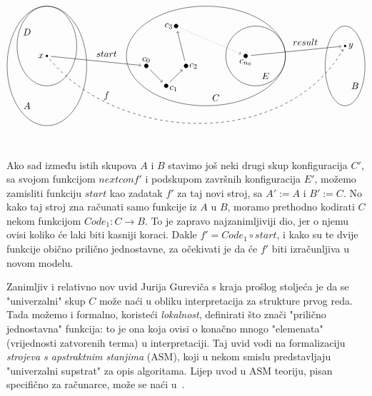 \begin{equation}\label{dia:alg}
\begin{tikzpicture}[scale=0.75,baseline=(c0)]
\draw (0,0) ellipse (2 and 3);
\draw (8,0.5) ellipse (4 and 2.5);
\draw (15,0) ellipse (1 and 2);
\draw (0,1) ellipse (1.5 and 2);
\draw (10.5,0.5) circle (1.5);
\draw[fill] (0,0.5) coordinate (x) circle (0.05) node[left]{$x$};
\node at(-1,1.7) {$D$};
\node at(-1,-2) {$A$};
\node at(8.5,-1.6) {$C$};
\node at(11,-0.5) {$E$};
\node at(15.5,-1) {$B$};
\node at(3,0.6) {$start$};
\node at(13,1.2) {$result$};
\node at(3,-1.5) {$f$};
\draw[fill] (5,0) coordinate (c0) circle (0.1) node[above]{$c_0$};
\draw[fill] (6,-1) coordinate (c1) circle (0.1) node[right,yshift=-3]{$c_1$};
\draw[fill] (7,0) coordinate (c2) circle (0.1) node[right]{$c_2$};
\draw[fill] (6.5,2) coordinate (c3) circle (0.1) node[left]{$c_3$};
\draw[fill] (10,0.5) coordinate (cn0) circle (0.1) node[below]{$c_{n_0}$};
\draw[fill] (15,1) coordinate (y) circle (0.05) node[right]{$y$};
\draw[shorten <=1.5mm,shorten >=2mm,->] (x) -- (c0);
\draw[shorten <=2mm,shorten >=2mm,->] (c0) -- (c1);
\draw[shorten <=2mm,shorten >=2mm,->] (c1) -- (c2);
\draw[shorten <=2mm,shorten >=2mm,->] (c2) -- (c3);
\draw[dotted,shorten <=2mm,shorten >=2mm,->] (c3) -- (cn0);
\draw[shorten <=2mm,shorten >=1.5mm,->] (cn0) -- (y);
\draw[shorten <=1.5mm, shorten >=1.5mm,dashed,->] (x) to[in=240,out=-50] (y);
\end{tikzpicture}    
\end{equation}


Ako sad između istih skupova $A$ i $B$ stavimo još neki drugi skup konfiguracija $C'$, sa svojom funkcijom $nextconf'$ i podskupom završnih konfiguracija $E'$, možemo zamisliti funkciju $start$ kao zadatak $f'$ za taj novi stroj, sa $A':=A$ i $B':=C$. No kako taj stroj zna računati samo funkcije iz $A$ u $B$, moramo prethodno kodirati $C$ nekom funkcijom $Code_1\colon C\to B$. To je zapravo najzanimljiviji dio, jer o njemu ovisi koliko će laki biti kasniji koraci. Dakle $f'=Code_1\circ start$, i kako su te dvije funkcije obično prilično jednostavne, za očekivati je da će $f'$ biti izračunljiva u novom modelu.

\begin{napomena}\label{nap:ASM}
Zanimljiv i relativno nov uvid Jurija Gureviča s kraja prošlog stoljeća je da se "univerzalni" skup $C$ može naći u obliku interpretacija za strukture prvog reda. Tada možemo i formalno, koristeći \emph{lokalnost}, definirati što znači "prilično jednostavna" funkcija: to je ona koja ovisi o konačno mnogo "elemenata" (vrijednosti zatvorenih terma) u interpretaciji. Taj uvid vodi na formalizaciju \emph{strojeva s apstraktnim stanjima} (ASM), koji u nekom smislu predstavljaju "univerzalni supstrat" za opis algoritama. Lijep uvod u ASM teoriju, pisan specifično za računarce, može se naći u~\cite{huggins}.
\end{napomena}

